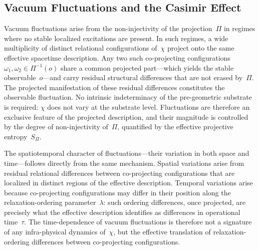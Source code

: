 \subsection{Vacuum Fluctuations and the Casimir Effect}
  \label{subsec:vacuum-fluctuations-and-the-casimir-effect}

  Vacuum fluctuations arise from the non-injectivity of the projection~$\Pi$ in
  regimes where no stable localized excitations are present.
  In such regimes, a wide multiplicity of distinct relational configurations of~$\chi$
  project onto the same effective spacetime description.
  Any two such co-projecting configurations $\omega_1, \omega_2 \in \Pi^{-1}(o)$
  share a common projected part---which yields the stable observable~$o$---and carry
  residual structural differences that are not erased by~$\Pi$.
  The projected manifestation of these residual differences constitutes the observable
  fluctuation.
  No intrinsic indeterminacy of the pre-geometric substrate is required: $\chi$ does not
  vary at the substrate level.
  Fluctuations are therefore an exclusive feature of the projected description, and their
  magnitude is controlled by the degree of non-injectivity of~$\Pi$, quantified by the
  effective projective entropy~$S_\Pi$.

  The spatiotemporal character of fluctuations---their variation in both space and
  time---follows directly from the same mechanism.
  Spatial variations arise from residual relational differences between co-projecting
  configurations that are localized in distinct regions of the effective description.
  Temporal variations arise because co-projecting configurations may differ in their
  position along the relaxation-ordering parameter~$\lambda$: such ordering differences,
  once projected, are precisely what the effective description identifies as differences in
  operational time~$\tau$.
  The time-dependence of vacuum fluctuations is therefore not a signature of any
  infra-physical dynamics of~$\chi$, but the effective translation of relaxation-ordering
  differences between co-projecting configurations.

